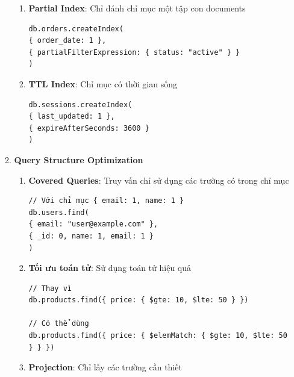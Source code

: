 \begin{enumerate}
\begin{enumerate}
\begin{enumerate}
        \item \textbf{Partial Index}: Chỉ đánh chỉ mục một tập con documents
        
\begin{lstlisting}[style=mongodb, caption=Ví dụ Partial Index trong MongoDB, label=mongodb:example]
db.orders.createIndex(
{ order_date: 1 },
{ partialFilterExpression: { status: "active" } }
)
\end{lstlisting}
        
        \item \textbf{TTL Index}: Chỉ mục có thời gian sống
        
\begin{lstlisting}[style=mongodb, caption=Ví dụ TTL Index trong MongoDB, label=mongodb:example]
db.sessions.createIndex(
{ last_updated: 1 },
{ expireAfterSeconds: 3600 }
)
\end{lstlisting}
        
        
        \end{enumerate}
        
        
        \item \textbf{Query Structure Optimization}
        
        \begin{enumerate}
        \item \textbf{Covered Queries}: Truy vấn chỉ sử dụng các trường có trong chỉ mục
        
        
\begin{lstlisting}[style=mongodb, caption=Ví dụ Covered Queries trong MongoDB, label=mongodb:example]
// Với chỉ mục { email: 1, name: 1 }
db.users.find(
{ email: "user@example.com" },
{ _id: 0, name: 1, email: 1 }
)
\end{lstlisting}
        
        \item \textbf{Tối ưu toán tử}: Sử dụng toán tử hiệu quả
        
\begin{lstlisting}[style=mongodb, caption=Ví dụ Tối ưu toán tử trong MongoDB, label=mongodb:example]
// Thay vì
db.products.find({ price: { $gte: 10, $lte: 50 } })

// Có thể dùng
db.products.find({ price: { $elemMatch: { $gte: 10, $lte: 50 } } })
\end{lstlisting}
        
        
        \item \textbf{Projection}: Chỉ lấy các trường cần thiết
        

\end{enumerate}
\end{enumerate}
\end{enumerate}
